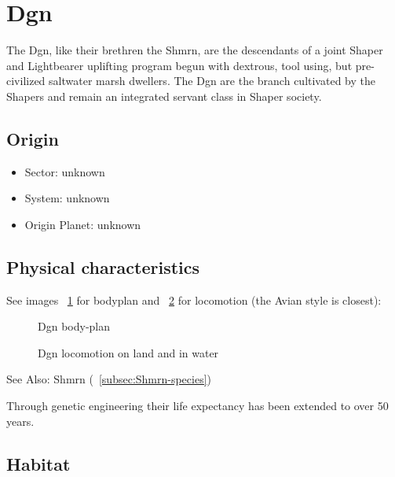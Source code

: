 \section{Dgn}

The Dgn, like their brethren the Shmrn, are the descendants of a joint
Shaper and Lightbearer uplifting program begun with dextrous, tool
using, but pre-civilized saltwater marsh dwellers. The Dgn are the
branch cultivated by the Shapers and remain an integrated servant
class in Shaper society.

\subsection{Origin}
\begin{itemize}
\item Sector: unknown
\item System: unknown
\item Origin Planet: unknown
\end{itemize}

\subsection{Physical characteristics}
See images ~\ref{fig:Dgn-body} for bodyplan and ~\ref{fig:Dgn-motion} for locomotion (the Avian style is closest): 

\begin{figure}
\begin{center}
    \caption{Dgn body-plan}
    \label{fig:Dgn-body}
\end{center}
\end{figure}

\begin{figure}
\begin{center}
    \caption{Dgn locomotion on land and in water}
    \label{fig:Dgn-motion}
\end{center}
\end{figure}



See Also: Shmrn (~\ref{subsec:Shmrn-species})

Through genetic engineering their life expectancy has been extended to over 50 years. 

\subsection{Habitat}

